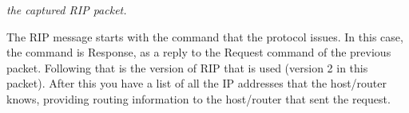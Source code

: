 \textit{the captured RIP packet.} \newline

The RIP message starts with the command that the protocol issues. In this case, the command is Response, as a reply to the Request command of the previous packet. Following that is the version of RIP that is used (version 2 in this packet). After this you have a list of all the IP addresses that the host/router knows, providing routing information to the host/router that sent the request.